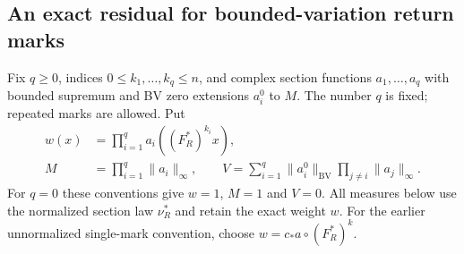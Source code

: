 \subsection{An exact residual for bounded-variation return marks}
Fix $q\ge0$, indices $0\le k_1,\ldots,k_q\le n$, and complex section
functions $a_1,\ldots,a_q$ with bounded supremum and BV zero extensions
$a_i^0$ to $M$. The number $q$ is fixed; repeated marks are allowed.
Put
\begin{equation}\label{eq:geometric-weight-budgets}
 \begin{split}
 w(x)&=\prod_{i=1}^q a_i((F_R^*)^{k_i}x),\\
 M&=\prod_{i=1}^q\|a_i\|_\infty,\qquad
 V=\sum_{i=1}^q\|a_i^0\|_{\mathrm{BV}}
                         \prod_{j\ne i}\|a_j\|_\infty.
 \end{split}
\end{equation}
For $q=0$ these conventions give $w=1$, $M=1$ and $V=0$.
All measures below use the normalized section law $\nu_R^*$ and retain
the exact weight $w$. For the earlier unnormalized single-mark convention,
choose $w=c_*a\circ(F_R^*)^k$.

